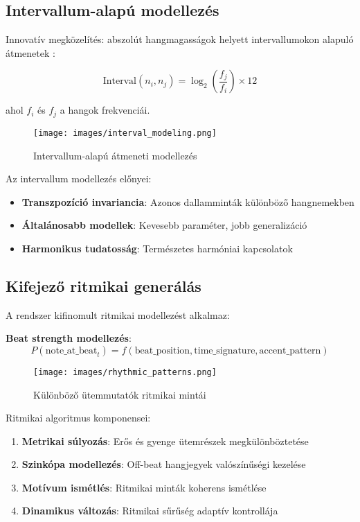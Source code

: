 \subsection{Intervallum-alapú modellezés}
Innovatív megközelítés: abszolút hangmagasságok helyett intervallumokon alapuló átmenetek \cite{briot2017deep}:

\[
\text{Interval}(n_i, n_j) = \log_2\left(\frac{f_j}{f_i}\right) \times 12
\]

ahol $f_i$ és $f_j$ a hangok frekvenciái.

\begin{figure}[h]
\centering
\texttt{[image: images/interval\_modeling.png]}
\caption{Intervallum-alapú átmeneti modellezés}
\label{fig:intervals}
\end{figure}

Az intervallum modellezés előnyei:
\begin{itemize}
\item \textbf{Transzpozíció invariancia}: Azonos dallamminták különböző hangnemekben
\item \textbf{Általánosabb modellek}: Kevesebb paraméter, jobb generalizáció
\item \textbf{Harmonikus tudatosság}: Természetes harmóniai kapcsolatok
\end{itemize}

\subsection{Kifejező ritmikai generálás}
A rendszer kifinomult ritmikai modellezést alkalmaz:

\textbf{Beat strength modellezés}:
\[
P(\text{note\_at\_beat}_t) = f(\text{beat\_position}, \text{time\_signature}, \text{accent\_pattern})
\]

\begin{figure}[h]
\centering
\texttt{[image: images/rhythmic\_patterns.png]}
\caption{Különböző ütemmutatók ritmikai mintái}
\label{fig:rhythmic}
\end{figure}

Ritmikai algoritmus komponensei:
\begin{enumerate}
\item \textbf{Metrikai súlyozás}: Erős és gyenge ütemrészek megkülönböztetése
\item \textbf{Szinkópa modellezés}: Off-beat hangjegyek valószínűségi kezelése
\item \textbf{Motívum ismétlés}: Ritmikai minták koherens ismétlése
\item \textbf{Dinamikus változás}: Ritmikai sűrűség adaptív kontrollája
\end{enumerate}

